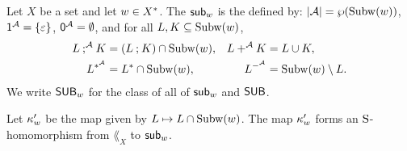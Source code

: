 \begin{definition}\label{definition: subword language algebra}
    Let $X$ be a set and let $\word \in X^*$.
    The \intro*{} $\subw_{\word}$ is the  defined by:
    $\domain{\alg} = \wp(\Subw(\word))$,
    $\id^{\alg} = \set{\eps}$,
    $\emp^{\alg} = \emptyset$,
    and for all $\la[1], \la[2] \subseteq \Subw(\word)$,
    \begin{align*}
        \la[1] \compo^{\alg} \la[2] & = (\la[1] \compo \la[2]) \cap \Subw(\word),             &
        \la[1] \union^{\alg} \la[2] & = \la[1] \cup \la[2],                      \\
        \la[1]^{\kstar^{\alg}}      & = \la[1]^{\kstar} \cap \Subw(\word),                    &
        \la[1]^{\compl^{\alg}}      & = \Subw(\word) \setminus \la[1]. 
    \end{align*}
    We write $\SUBW_{\word}$ for the class of all  of $\subw_{\word}$ and $\mathsf{SUB}$.
    \lipicsEnd
\end{definition}
Let $\kappa_{\word}'$ be the map given by $L \mapsto L \cap \Subw(\word)$.
The map $\kappa_{\word}'$ forms an $\mathrm{S}$-homomorphism from $\lang_{X}$ to $\subw_{\word}$.

